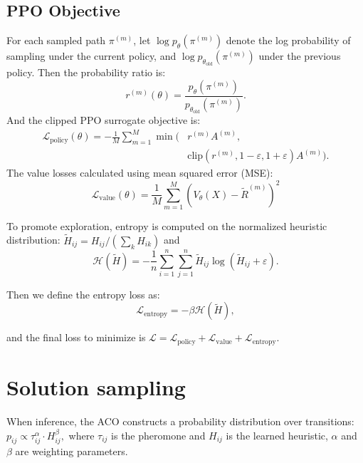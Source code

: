 \documentclass[a4paper,conference]{IEEEtran}
\newcommand{\calH}{\mathcal{H}}
\newcommand{\eps}{\varepsilon}
\begin{document}
\subsection{PPO Objective}
For each sampled path $\pi^{(m)}$, let $\log p_{\theta}(\pi^{(m)})$ denote the log probability of sampling under the current policy, and $\log p_{\theta_{\text{old}}}(\pi^{(m)})$ under the previous policy.
Then the probability ratio is:
\begin{equation}
r^{(m)}(\theta) = \frac{p_{\theta}(\pi^{(m)})}{p_{\theta_{\text{old}}}(\pi^{(m)})}.
\end{equation}
And the clipped PPO surrogate objective is:
\begin{equation}
\begin{aligned}
\mathcal{L}_{\text{policy}}(\theta) = -\frac{1}{M}\sum_{m=1}^M \min\big(&r^{(m)}A^{(m)}, \\
&\text{clip}(r^{(m)},1-\eps,1+\eps)A^{(m)}\big).
\end{aligned}
\end{equation}
The value losses calculated using mean squared error (MSE):
\begin{equation}
\mathcal{L}_{\text{value}}(\theta)
= \frac{1}{M}\sum_{m=1}^{M}\!\left(V_\theta(X) - \tilde R^{(m)}\right)^2
\end{equation}

To promote exploration, entropy is computed on the normalized heuristic distribution: $\tilde{H}_{ij} = H_{ij} / (\sum_k H_{ik})$ and
\begin{equation}
\calH(\tilde{H}) = -\frac{1}n \sum_{i=1}^n\sum_{j=1}^n \tilde{H}_{ij}\log(\tilde{H}_{ij}+\eps).
\end{equation}

Then we define the entropy loss as:
\begin{equation}
\mathcal{L}_{\text{entropy}} = -\beta\calH(\tilde{H}),
\end{equation}

and the final loss to minimize is $\mathcal{L}=\mathcal{L}_{\text{policy}}+\mathcal{L}_{\text{value}}+\mathcal{L}_{\text{entropy}}$.

\section{Solution sampling}
When inference, the ACO constructs a probability distribution over transitions:
$
p_{ij} \propto \tau_{ij}^\alpha \cdot H_{ij}^\beta,
$
where $\tau_{ij}$ is the pheromone and $H_{ij}$ is the learned heuristic, $\alpha$ and $\beta$ are weighting parameters.
\end{document}
